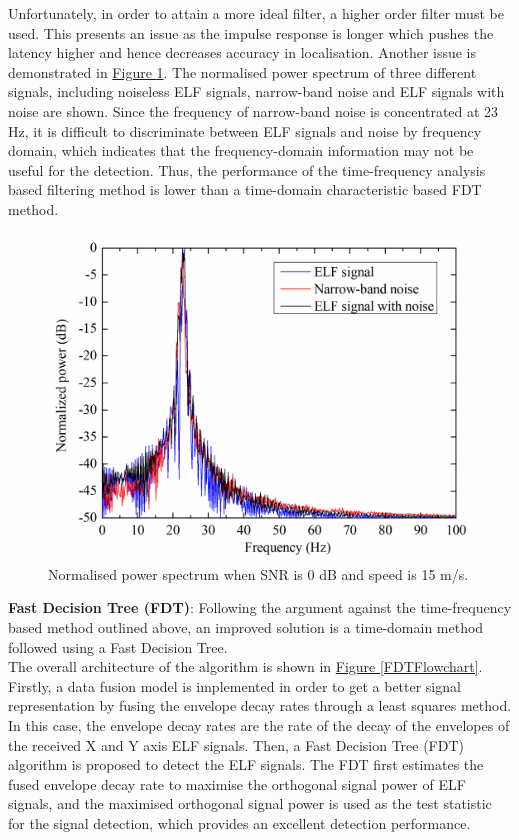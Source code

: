 \documentclass[11pt]{article}		%
\newlength{\imageheight}	 %
\newcommand{\figref}[1]{\hyperref[#1]{Figure \ref*{#1}}}    %
\begin{document}
			Unfortunately, in order to attain a more ideal filter, a higher order filter must be used.
			This presents an issue as the impulse response is longer which pushes the latency higher and hence decreases accuracy in localisation. 
			Another issue is demonstrated in \figref{SNRPower}.
			The normalised power spectrum of three different signals, including noiseless ELF signals, narrow-band noise and ELF signals with noise are shown. 
			Since the frequency of narrow-band noise is concentrated at 23 Hz, it is difficult to discriminate between ELF signals and noise by frequency domain, which indicates that the frequency-domain information may not be useful for the detection. 
			Thus, the performance of the time-frequency analysis based filtering method is lower than a time-domain characteristic based FDT method.
	
	         \begin{figure}[h]
				\centering
				\includegraphics[height=\imageheight]{SNRPower.png}
				\caption{Normalised power spectrum when SNR is 0 dB and speed is 15 m/s.}
				\label{SNRPower}
			\end{figure}
		    
		    \textbf{Fast Decision Tree (FDT)}:
			Following the argument against the time-frequency based method outlined above, an improved solution is a time-domain method followed using a Fast Decision Tree. 
			\\
	    	\hspace*{3ex}The overall architecture of the algorithm is shown in \figref{FDTFlowchart}. 
	    	Firstly, a data fusion model is implemented in order to get a better signal representation by fusing the envelope decay rates through a least squares method. 
	    	In this case, the envelope decay rates are the rate of the decay of the envelopes of the received X and Y axis ELF signals. 
	    	Then, a Fast Decision Tree (FDT) algorithm is proposed to detect the ELF signals. 
	    	The FDT first estimates the fused envelope decay rate to maximise the orthogonal signal power of ELF signals, and the maximised orthogonal signal power is used as the test statistic for the signal detection, which provides an excellent detection performance.
	        
\end{document}
